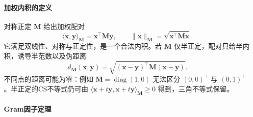 \paragraph{加权内积的定义}

对称正定 $\bm M$ 给出加权配对
\[
 \langle\bm x,\bm y\rangle_{\bm M}=\bm x^\top\bm M\bm y,
 \qquad
 \lVert\bm x\rVert_{\bm M}=\sqrt{\bm x^\top\bm M\bm x}.
\]
它满足双线性、对称与正定性，是一个合法内积。若 $\bm M$ 仅半正定，配对只给半内积，诱导半范数以及伪距离
\begin{equation}
 d_{\bm M}(\bm x,\bm y)
 =\sqrt{(\bm x-\bm y)^\top\bm M(\bm x-\bm y)}.
 \label{eq:linear-algebra-mahalanobis-pseudodistance}
\end{equation}
不同点的距离可能为零：例如 $\bm M=\operatorname{diag}(1,0)$ 无法区分 $(0,0)^\top$ 与 $(0,1)^\top$。半正定的CS不等式仍可由 $\langle\bm x+t\bm y,\bm x+t\bm y\rangle_{\bm M}\geq0$ 得到，三角不等式保留。

\paragraph{Gram因子定理}

